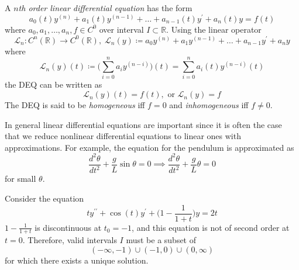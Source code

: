 \documentclass{article}
\newcounter{definition}[section]
\newcounter{example}[section]
\begin{document}
  \begin{definition}
    \label{def:nth-order-linear-deq}
  A \textit{$n$th order linear differential equation} has the form
  \begin{equation}
    a_0 (t) y^{(n)} + a_1 (t) y^{(n-1)} + \ldots + a_{n-1} (t) y^\prime + a_n (t) y = f(t)
  \end{equation}
  where $a_0, a_1, \ldots, a_n, f \in C^0$ over interval $I \subset \mathbb{R}$. Using the linear operator 
  \begin{equation}
    \mathcal{L}_n : C^n (\mathbb{R}) \to C^0 (\mathbb{R}), \; \mathcal{L}_n (y) \coloneqq a_0 y^{(n)} + a_1 y^{(n-1)} + \ldots + a_{n-1} y^\prime + a_n y
  \end{equation}
  where 
  \begin{equation}
    \mathcal{L}_n (y) (t) \coloneqq \bigg( \sum_{i=0}^n a_i y^{(n-i)} \bigg) (t) = \sum_{i=0}^n a_i (t) y^{(n-i)} (t)
  \end{equation}
  the DEQ can be written as
  \begin{equation}
    \mathcal{L}_n (y) (t) = f(t), \text{ or } \mathcal{L}_n (y) = f
  \end{equation}
  The DEQ is said to be \textit{homogeneous} iff $f = 0$ and \textit{inhomogeneous} iff $f \neq 0$. 
  \end{definition}

  In general linear differential equations are important since it is often the case that we reduce nonlinear differential equations to linear ones with approximations. For example, the equation for the pendulum is approximated as
  \begin{equation}
    \frac{d^2 \theta}{d t^2} + \frac{g}{L} \sin{\theta} = 0 \implies \frac{d^2 \theta}{d t^2} + \frac{g}{L} \theta = 0
  \end{equation}
  for small $\theta$. 

  \begin{example}
    \label{ex:interval-of-validity-for-a-discontinuous}
  Consider the equation 
  \begin{equation}
    t y^{\prime \prime} + \cos{(t)} y^\prime + \Big( 1 - \frac{1}{1+t}\Big) y = 2t
  \end{equation}
  $1 - \frac{1}{1+t}$ is discontinuous at $t_0 = -1$, and this equation is not of second order at $t=0$. Therefore, valid intervals $I$ must be a subset of 
  \begin{equation}
    (-\infty, -1) \cup (-1, 0) \cup (0, \infty)
  \end{equation}
  for which there exists a unique solution. 
  \end{example}
\end{document}
